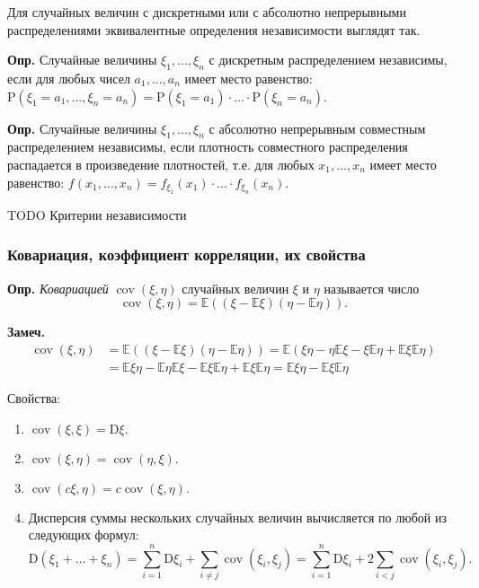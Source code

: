 \documentclass[oneside,final,14pt]{extreport}
\newcommand\mydef{{\bf Опр.}}
\newcommand\mynote{{\bf Замеч.}}
\theoremstyle{definition}
\begin{document}
Для случайных величин с дискретными или с абсолютно непрерывными
распределениями эквивалентные определения независимости выглядят так.

\mydef{} Случайные величины $\xi_1, ..., \xi_n$ с дискретным распределением независимы, если для любых чисел $a_1, ..., a_n$ имеет место равенство: $\mathrm{P}\left(\xi_{1}=a_{1}, \ldots, \xi_{n}=a_{n}\right)=\mathrm{P}\left(\xi_{1}=a_{1}\right) \cdot \ldots \cdot \mathrm{P}\left(\xi_{n}=a_{n}\right)$.

\mydef{} Случайные величины $\xi_1, ..., \xi_n$ с абсолютно непрерывным совместным распределением независимы, если плотность совместного распределения распадается в произведение плотностей, т.е. для любых $x_1, ..., x_n$ имеет место равенство: $f\left(x_{1}, \ldots, x_{n}\right)=f_{\xi_{1}}\left(x_{1}\right) \cdot \ldots \cdot f_{\xi_{n}}\left(x_{n}\right)$.

TODO Критерии независимости

\subsubsection{Ковариация, коэффициент корреляции, их свойства}

\mydef{} {\it Ковариацией} $\operatorname{cov}(\xi,\eta)$ случайных величин $\xi$ и $\eta$ называется число $$\operatorname{cov}(\xi,\eta)=\mathbb{E}((\xi-\mathbb{E} \xi)(\eta-\mathbb{E} \eta)).$$

\mynote{} $$\begin{aligned} \operatorname{cov}(\xi, \eta) &=\mathbb{E}((\xi-\mathbb{E} \xi)(\eta-\mathbb{E} \eta))=\mathbb{E}(\xi \eta-\eta \mathbb{E} \xi-\xi \mathbb{E} \eta+\mathbb{E} \xi \mathbb{E} \eta) \\ &=\mathbb{E} \xi \eta-\mathbb{E} \eta \mathbb{E} \xi-\mathbb{E} \xi \mathbb{E} \eta+\mathbb{E} \xi \mathbb{E} \eta=\mathbb{E} \xi \eta-\mathbb{E} \xi \mathbb{E} \eta \end{aligned}$$

Свойства:

\begin{enumerate}
    \item $\operatorname{cov}(\xi, \xi)=\mathrm{D} \xi.$
    \item $\operatorname{cov}(\xi, \eta)=\operatorname{cov}(\eta, \xi).$
    \item $\operatorname{cov}(c \xi, \eta)=c \operatorname{cov}(\xi, \eta).$
    \item Дисперсия суммы нескольких случайных величин вычисляется по любой из следующих формул:
    $$\mathrm{D}\left(\xi_{1}+\ldots+\xi_{n}\right)=\sum_{i=1}^{n} \mathrm{D} \xi_{i}+\sum_{i \neq j} \operatorname{cov}\left(\xi_{i}, \xi_{j}\right)=\sum_{i=1}^{n} \mathrm{D} \xi_{i}+2 \sum_{i<j} \operatorname{cov}\left(\xi_{i}, \xi_{j}\right).$$
\end{enumerate}
\end{document}
